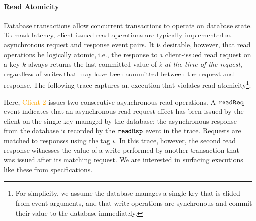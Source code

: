 \paragraph{Read Atomicity}
Database transactions allow concurrent transactions to operate on
database state.  To mask latency, client-issued read operations are
typically implemented as asynchronous request and response event
pairs.  It is desirable, however, that read operations be logically
atomic, i.e., the response to a client-issued read request on a key
$k$ always returns the last committed value of $k$ \emph{at the time
  of the request}, regardless of writes that may have been committed
between the request and response.
The following trace captures an
execution that violates read atomicity\footnote{For simplicity, we
  assume the database manages a single key that is elided from event
  arguments, and that write operations are synchronous and commit
  their value to the database immediately.}: %
\vspace{-.4cm} \par{}\noindent
  Here, \textcolor{orange}{Client 2} issues two consecutive asynchronous
  read operations.  A $\boldsymbol{{\tt readReq}}$ event indicates that an asynchronous
  read request effect has been issued by the client on the single key managed
  by the database; the asynchronous response
  from the database is recorded by the $\boldsymbol{{\tt readRsp}}$ event in the trace.  Requests
  are matched to responses using the tag $\iota$.  In this trace, however,
  the second read response witnesses the value of a write performed by another
  transaction that was issued after its matching request.   We are
  interested in surfacing executions like these from \tyName{}
  specifications. 

